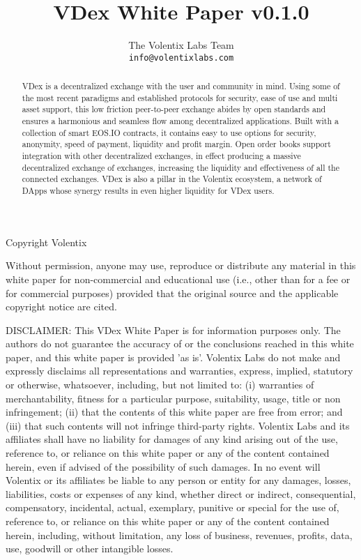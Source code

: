 \documentclass[]{article}
\title{VDex White Paper v0.1.0}
\author{
		The Volentix Labs Team\\
	\texttt{info@volentixlabs.com}
}
\begin{document}
\tableofcontents
\maketitle
\begin{description}
\item Copyright  Volentix
\end{description}

{\tiny Without permission, anyone may use, reproduce or distribute any material in this white paper for non-commercial and educational use (i.e., other than for a fee or for commercial purposes) provided that the original source and the applicable copyright notice are cited.

DISCLAIMER: This VDex White Paper  is for information purposes only. The authors do not guarantee the accuracy of or the conclusions reached in this white paper, and this white paper is provided 'as is'. 
Volentix Labs do not make and expressly disclaims all representations and warranties, express, implied, statutory or otherwise, whatsoever, including, but not limited to: 
(i) warranties of merchantability, fitness for a particular purpose, suitability, usage, title or non infringement; (ii) that the contents of this white paper are free from error; and (iii) that such contents will not infringe third-party rights. Volentix Labs and its affiliates shall have no liability for damages of any kind arising out of the use, reference to, or reliance on this white paper or any of the content contained herein, even if advised of the possibility of such damages. In no event will Volentix or its affiliates be liable to any person or entity for any damages, losses, liabilities, costs or expenses of any kind, whether direct or indirect, consequential, compensatory, incidental, actual, exemplary, punitive or special for the use of, reference to, or reliance on this white paper or any of the content contained herein, including, without limitation, any loss of business, revenues, profits, data, use, goodwill or other intangible losses.}

\begin{abstract}

VDex is a decentralized exchange with the user and community in mind. 
Using some of the most recent paradigms and established protocols for security, 
ease of use and multi asset support, this low friction peer-to-peer exchange 
abides by open standards and ensures a harmonious and seamless flow among 
decentralized applications. Built with a collection of smart EOS.IO contracts, 
it contains easy to use options for security, anonymity, speed of payment, liquidity and profit margin.
Open order books support integration with other decentralized exchanges, 
in effect producing a massive decentralized exchange of exchanges,
 increasing the liquidity and effectiveness of all the connected exchanges.
VDex is also a pillar in the Volentix ecosystem, a network of DApps whose synergy results in even
higher liquidity for VDex users.
\end{abstract}
\end{document}
